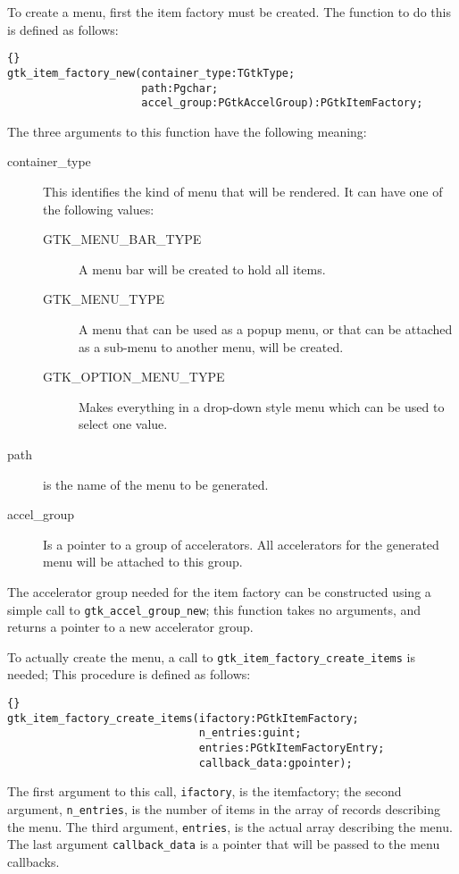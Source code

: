 \documentclass[10pt]{article}
\begin{document}
To create a menu, first the item factory must be created. The function to do 
this is defined as follows:
\begin{lstlisting}{}
gtk_item_factory_new(container_type:TGtkType; 
                     path:Pgchar;
                     accel_group:PGtkAccelGroup):PGtkItemFactory;
\end{lstlisting}
The three arguments to this function have the following meaning:
\begin{description}
\item[container\_type] This identifies the kind of menu that will be
rendered. It can have one of the following values:
\begin{description}
\item[GTK\_MENU\_BAR\_TYPE] A menu bar will be created to hold all items.
\item[GTK\_MENU\_TYPE] A menu that can be used as a popup menu, or that can be
attached as a sub-menu to another menu, will be created.
\item[GTK\_OPTION\_MENU\_TYPE] Makes everything in a drop-down style menu which
can be used to select one value.
\end{description}
\item[path] is the name of the menu to be generated.
\item[accel\_group] Is a pointer to a group of accelerators. All
accelerators for the generated menu will be attached to this group.
\end{description}

The accelerator group needed for the item factory can be constructed 
using a simple call to \lstinline|gtk_accel_group_new|; this function 
takes no arguments, and returns a pointer to a new accelerator group.

To actually create the menu, a call to
\lstinline|gtk_item_factory_create_items| is needed; This procedure is 
defined as follows:
\begin{lstlisting}{}
gtk_item_factory_create_items(ifactory:PGtkItemFactory; 
                              n_entries:guint; 
                              entries:PGtkItemFactoryEntry; 
                              callback_data:gpointer);
\end{lstlisting}
The first argument to this call, \lstinline|ifactory|, is the itemfactory; 
the second argument, \lstinline|n_entries|, is the number of items in the 
array of records describing the menu. The third argument, \lstinline|entries|,
is the actual array describing the menu. The last argument
\lstinline|callback_data| is a pointer that will be passed to the menu
callbacks.
\end{document}
